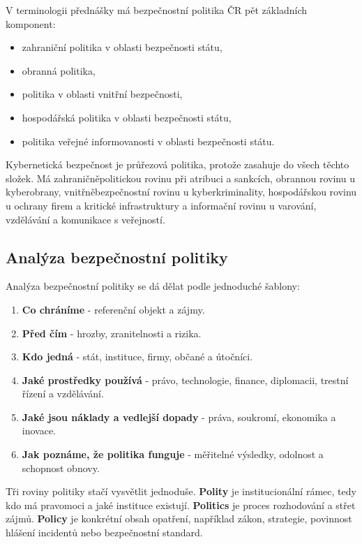 \documentclass[11pt,a4paper]{article}
\begin{document}
V terminologii přednášky má bezpečnostní politika ČR pět základních komponent:
\begin{itemize}
  \item zahraniční politika v oblasti bezpečnosti státu,
  \item obranná politika,
  \item politika v oblasti vnitřní bezpečnosti,
  \item hospodářská politika v oblasti bezpečnosti státu,
  \item politika veřejné informovanosti v oblasti bezpečnosti státu.
\end{itemize}

Kybernetická bezpečnost je průřezová politika, protože zasahuje do všech těchto složek. Má zahraničněpolitickou rovinu při atribuci a sankcích, obrannou rovinu u kyberobrany, vnitřněbezpečnostní rovinu u kyberkriminality, hospodářskou rovinu u ochrany firem a kritické infrastruktury a informační rovinu u varování, vzdělávání a komunikace s veřejností.

\subsection*{Analýza bezpečnostní politiky}
Analýza bezpečnostní politiky se dá dělat podle jednoduché šablony:
\begin{enumerate}
  \item \textbf{Co chráníme} - referenční objekt a zájmy.
  \item \textbf{Před čím} - hrozby, zranitelnosti a rizika.
  \item \textbf{Kdo jedná} - stát, instituce, firmy, občané a útočníci.
  \item \textbf{Jaké prostředky používá} - právo, technologie, finance, diplomacii, trestní řízení a vzdělávání.
  \item \textbf{Jaké jsou náklady a vedlejší dopady} - práva, soukromí, ekonomika a inovace.
  \item \textbf{Jak poznáme, že politika funguje} - měřitelné výsledky, odolnost a schopnost obnovy.
\end{enumerate}

Tři roviny politiky stačí vysvětlit jednoduše. \textbf{Polity} je institucionální rámec, tedy kdo má pravomoci a jaké instituce existují. \textbf{Politics} je proces rozhodování a střet zájmů. \textbf{Policy} je konkrétní obsah opatření, například zákon, strategie, povinnost hlášení incidentů nebo bezpečnostní standard.
\end{document}
